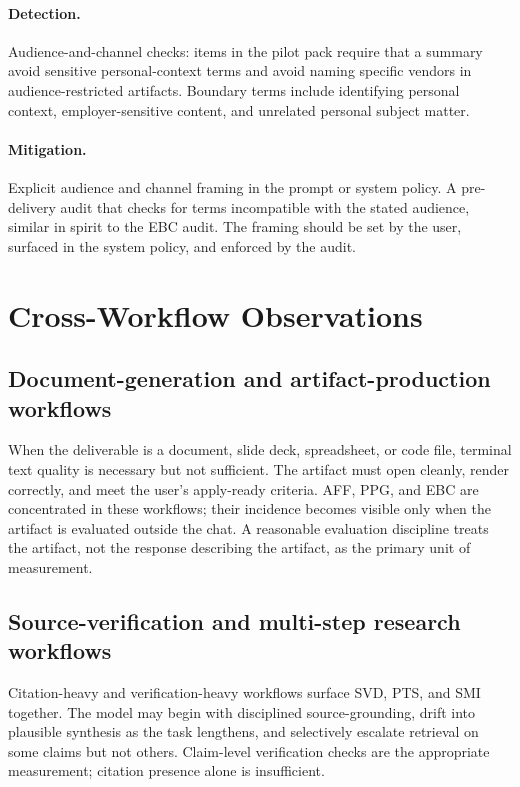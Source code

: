 \documentclass[11pt]{article}
\begin{document}
\paragraph{Detection.} Audience-and-channel checks: items in the pilot pack require that a summary avoid sensitive personal-context terms and avoid naming specific vendors in audience-restricted artifacts. Boundary terms include identifying personal context, employer-sensitive content, and unrelated personal subject matter.

\paragraph{Mitigation.} Explicit audience and channel framing in the prompt or system policy. A pre-delivery audit that checks for terms incompatible with the stated audience, similar in spirit to the EBC audit. The framing should be set by the user, surfaced in the system policy, and enforced by the audit.


\section{Cross-Workflow Observations}

\subsection{Document-generation and artifact-production workflows}
When the deliverable is a document, slide deck, spreadsheet, or code file, terminal text quality is necessary but not sufficient. The artifact must open cleanly, render correctly, and meet the user's apply-ready criteria. AFF, PPG, and EBC are concentrated in these workflows; their incidence becomes visible only when the artifact is evaluated outside the chat. A reasonable evaluation discipline treats the artifact, not the response describing the artifact, as the primary unit of measurement.

\subsection{Source-verification and multi-step research workflows}
Citation-heavy and verification-heavy workflows surface SVD, PTS, and SMI together. The model may begin with disciplined source-grounding, drift into plausible synthesis as the task lengthens, and selectively escalate retrieval on some claims but not others. Claim-level verification checks are the appropriate measurement; citation presence alone is insufficient.
\end{document}
